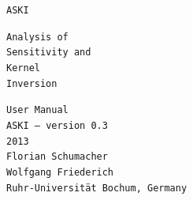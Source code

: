 \begin{titlepage}
\thispagestyle{empty}

  \begin{center}
    \tt \Huge ASKI
  \end{center}
  \vspace*{2cm}

  \begin{minipage}{0.5\textwidth}
    \begin{flushleft}
      \fontsize{20}{40} \selectfont
      {\tt {\Huge A}{\large nalysis of} \\ {\Huge S}{\large ensitivity and } \\ {\Huge\tt K}{\large ernel} \\ {\Huge\tt I}{\large nversion} }
    \end{flushleft}
  \end{minipage}
  \hfill
  \begin{minipage}{0.5\textwidth}
    \begin{flushright}
      {\fontsize{20}{40} \selectfont \tt {\Huge User Manual} \\  ASKI {\rm --} {\large version 0.3} \\ {\large 2013} \\}
      {\tt {\large Florian Schumacher \\Wolfgang Friederich} \\ {\small Ruhr-Universit\"at Bochum, Germany} }
    \end{flushright}
  \end{minipage}

\vspace*{3cm}

\begin{center}
  \setlength{\fboxsep}{0pt}%
  \setlength{\fboxrule}{2pt}%
\end{center}

\end{titlepage}




